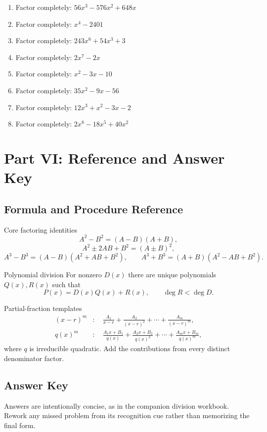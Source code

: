 \documentclass[11pt,oneside]{book}
\begin{document}
\begin{enumerate}[leftmargin=*,label=\textbf{\arabic*.},itemsep=0.65\baselineskip]
\item Factor completely: $ 56 x^{3} - 576 x^{2} + 648 x $
\item Factor completely: $ x^{4} - 2401 $
\item Factor completely: $ 243 x^{6} + 54 x^{3} + 3 $
\item Factor completely: $ 2 x^{7} - 2 x $
\item Factor completely: $ x^{2} - 3 x - 10 $
\item Factor completely: $ 35 x^{2} - 9 x - 56 $
\item Factor completely: $ 12 x^{3} + x^{2} - 3 x - 2 $
\item Factor completely: $ 2 x^{8} - 18 x^{5} + 40 x^{2} $
\end{enumerate}
\part{Part VI: Reference and Answer Key}
\chapter{Formula and Procedure Reference}
\begin{rulebox}{Core factoring identities}
\[
A^2-B^2=(A-B)(A+B),
\]
\[
A^2\pm2AB+B^2=(A\pm B)^2,
\]
\[
A^3-B^3=(A-B)(A^2+AB+B^2),\qquad
A^3+B^3=(A+B)(A^2-AB+B^2).
\]
\end{rulebox}
\begin{rulebox}{Polynomial division}
For nonzero $D(x)$ there are unique polynomials $Q(x),R(x)$ such that
\[
P(x)=D(x)Q(x)+R(x),\qquad \deg R<\deg D.
\]
\end{rulebox}
\begin{rulebox}{Partial-fraction templates}
\begin{align*}
(x-r)^m&:\quad \frac{A_1}{x-r}+\frac{A_2}{(x-r)^2}+\cdots+\frac{A_m}{(x-r)^m},\\
q(x)^m&:\quad \frac{A_1x+B_1}{q(x)}+\frac{A_2x+B_2}{q(x)^2}+\cdots+\frac{A_mx+B_m}{q(x)^m},
\end{align*}
where $q$ is irreducible quadratic. Add the contributions from every distinct denominator factor.
\end{rulebox}
\chapter{Answer Key}
Answers are intentionally concise, as in the companion division workbook. Rework any missed problem from its recognition cue rather than memorizing the final form.
\end{document}
